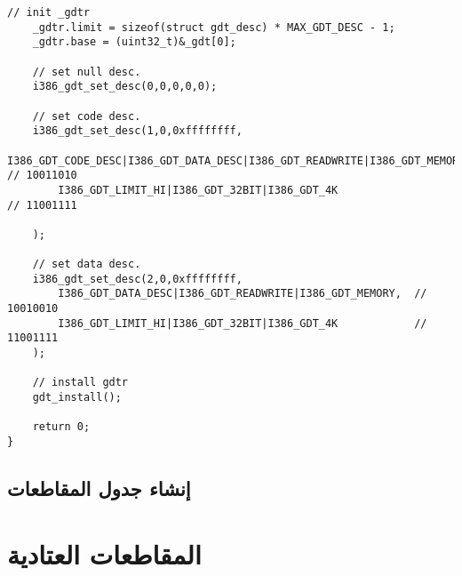 \documentclass[document.tex]{subfiles}
\begin{document}
\begin{english}
\begin{lstlisting}[label=gdt_c,caption=hal/gdt.cpp:Install GDT]
	// init _gdtr
	_gdtr.limit = sizeof(struct gdt_desc) * MAX_GDT_DESC - 1;
	_gdtr.base = (uint32_t)&_gdt[0];
	
	// set null desc.
	i386_gdt_set_desc(0,0,0,0,0);
	
	// set code desc.
	i386_gdt_set_desc(1,0,0xffffffff,
		I386_GDT_CODE_DESC|I386_GDT_DATA_DESC|I386_GDT_READWRITE|I386_GDT_MEMORY, 	// 10011010
		I386_GDT_LIMIT_HI|I386_GDT_32BIT|I386_GDT_4K 								// 11001111
 
	);
	
	// set data desc.
	i386_gdt_set_desc(2,0,0xffffffff,
		I386_GDT_DATA_DESC|I386_GDT_READWRITE|I386_GDT_MEMORY, 	// 10010010
		I386_GDT_LIMIT_HI|I386_GDT_32BIT|I386_GDT_4K			// 11001111
	);
	
	// install gdtr
	gdt_install();
	
	return 0;
}

\end{lstlisting}
\end{english}

\subsection{إنشاء جدول المقاطعات }

\section{}

\section{}

\section{المقاطعات العتادية }
\end{document}
